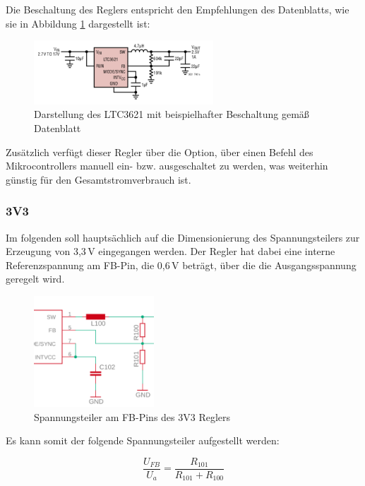 Die Beschaltung des Reglers entspricht den Empfehlungen des Datenblatts, wie sie in Abbildung \ref{fig.ltc3621} dargestellt ist:

\begin{figure}[H]
  \centering
  \includegraphics[width=0.6\textwidth]{./img/ltc3621.png}
  \caption{Darstellung des LTC3621 mit beispielhafter Beschaltung gemäß Datenblatt~\cite{ltc3621}}\label{fig.ltc3621}
\end{figure}

Zusätzlich verfügt dieser Regler über die Option, über einen Befehl des Mikrocontrollers manuell ein- bzw. ausgeschaltet zu werden, was weiterhin günstig für den Gesamtstromverbrauch ist.

\subsubsection{3V3}\label{subsubsec.3v3}
Im folgenden soll hauptsächlich auf die Dimensionierung des Spannungsteilers zur Erzeugung von 3,3\,V eingegangen werden. Der Regler hat dabei eine interne Referenzspannung am FB-Pin, die 0,6\,V beträgt, über die die Ausgangsspannung geregelt wird. 

\begin{figure}[H]
  \centering
  \includegraphics[width=0.4\textwidth]{./img/spannungsteiler_3v3.png}
  \caption{Spannungsteiler am FB-Pins des 3V3 Reglers}\label{fig.spgsteiler3v3}
\end{figure}

Es kann somit der folgende Spannungsteiler aufgestellt werden:

\begin{minipage}{\textwidth}
\begin{equation}\label{eq:Spannungsteiler3v3}
\frac {U_{FB}}{U_a}{=}  \frac{R_{101}}{R_{101}+R_{100}}
\end{equation}
\end{minipage}

